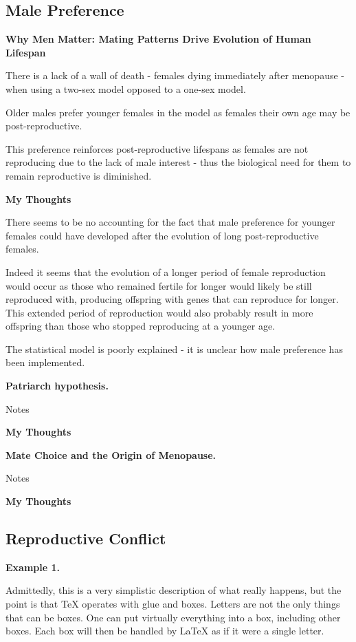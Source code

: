 \documentclass[authoryearcitations]{UoYCSproject}
\begin{document}
\subsection{Male Preference}
\begin{framed}
\noindent \textbf{Why Men Matter: Mating Patterns Drive Evolution of Human Lifespan \cite{whyMenMatter2007}}

There is a lack of a wall of death - females dying immediately after menopause - when using a two-sex model opposed to a one-sex model.

Older males prefer younger females in the model as females their own age may be post-reproductive.

This preference reinforces post-reproductive lifespans as females are not reproducing due to the lack of male interest - thus the biological need for them to remain reproductive is diminished.

\noindent \textbf{My Thoughts}

There seems to be no accounting for the fact that male preference for younger females could have developed after the evolution of long post-reproductive females.

Indeed it seems that the evolution of a longer period of female reproduction would occur as those who remained fertile for longer would likely be still reproduced with, producing offspring with genes that can reproduce for longer. This extended period of reproduction would also probably result in more offspring than those who stopped reproducing at a younger age.

The statistical model is poorly explained - it is unclear how male preference has been implemented.
\end{framed}

\begin{framed}
\noindent \textbf{Patriarch hypothesis. \cite{patriarchHypothesis2000}}

Notes

\noindent \textbf{My Thoughts}


\end{framed}


\begin{framed}
\noindent \textbf{Mate Choice and the Origin of Menopause. \cite{mateChoice2013}}

Notes

\noindent \textbf{My Thoughts}


\end{framed}


\subsection{Reproductive Conflict}
\begin{framed}
\noindent \textbf{Example 1.}

Admittedly, this is a very simplistic description of what really happens, but the point is that TeX operates with glue and boxes. Letters are not the only things that can be boxes. One can put virtually everything into a box, including other boxes. Each box will then be handled by LaTeX as if it were a single letter.
\end{framed}
\end{document}
